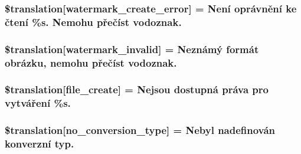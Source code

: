 \subsubsection[{\$translation}]{\setlength{\rightskip}{0pt plus 5cm}\$translation\mbox{[}\textquotesingle{}watermark\+\_\+create\+\_\+error\textquotesingle{}\mbox{]} = \textquotesingle{}Není oprávnění ke čtení \%s. Nemohu přečíst vodoznak.\textquotesingle{}}\label{class_8upload_8cs___c_s_8php_aabca0b65dadbc6184415c16375f284ca}
\hypertarget{class_8upload_8cs___c_s_8php_ac336e7a5701e47ba4a05e9e498a3cc44}{}
\subsubsection[{\$translation}]{\setlength{\rightskip}{0pt plus 5cm}\$translation\mbox{[}\textquotesingle{}watermark\+\_\+invalid\textquotesingle{}\mbox{]} = \textquotesingle{}Neznámý formát obrázku, nemohu přečíst vodoznak.\textquotesingle{}}\label{class_8upload_8cs___c_s_8php_ac336e7a5701e47ba4a05e9e498a3cc44}
\hypertarget{class_8upload_8cs___c_s_8php_a1ecb4673e4fb69e06b3f20b65cecf30a}{}
\subsubsection[{\$translation}]{\setlength{\rightskip}{0pt plus 5cm}\$translation\mbox{[}\textquotesingle{}file\+\_\+create\textquotesingle{}\mbox{]} = \textquotesingle{}Nejsou dostupná práva pro vytváření \%s.\textquotesingle{}}\label{class_8upload_8cs___c_s_8php_a1ecb4673e4fb69e06b3f20b65cecf30a}
\hypertarget{class_8upload_8cs___c_s_8php_a4712d7ec28e9a7f17eb3338af2358363}{}
\subsubsection[{\$translation}]{\setlength{\rightskip}{0pt plus 5cm}\$translation\mbox{[}\textquotesingle{}no\+\_\+conversion\+\_\+type\textquotesingle{}\mbox{]} = \textquotesingle{}Nebyl nadefinován konverzní typ.\textquotesingle{}}\label{class_8upload_8cs___c_s_8php_a4712d7ec28e9a7f17eb3338af2358363}
\hypertarget{class_8upload_8cs___c_s_8php_a783c9358bcf54a054545b50098bc679b}{}
